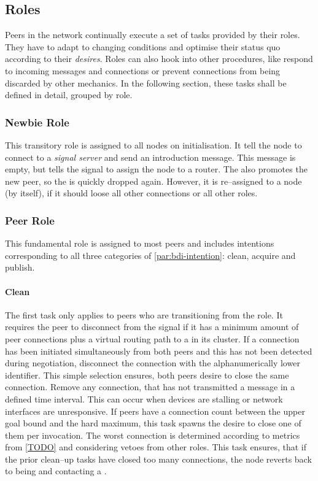 \subsection{Roles}
Peers in the network continually execute a set of tasks provided by their roles. They have to adapt to changing conditions and optimise their status quo according to their \textit{desires}. Roles can also hook into other procedures, like respond to incoming messages and connections or prevent connections from being discarded by other mechanics. In the following section, these tasks shall be defined in detail, grouped by role.

\subsubsection{Newbie Role}
This transitory role is assigned to all nodes on initialisation. It tell the node to connect to a \textit{signal server} and send an introduction message. This message is empty, but tells the signal to assign the node to a router. The \signalRole also promotes the new peer, so the \newbieRole is quickly dropped again. However, it is re–assigned to a node (by itself), if it should loose all other connections or all other roles.

\subsubsection{Peer Role}
This fundamental role is assigned to most peers and includes intentions corresponding to all three categories of \vref{par:bdi-intention}: clean, acquire and publish.

\paragraph{Clean}
\begin{itemize}
     The first task only applies to peers who are transitioning from the \newbieRole role. It requires the peer to disconnect from the signal if it has a minimum amount of peer connections plus a virtual routing path to a \routerRole in its cluster.
     If a connection has been initiated simultaneously from both peers and this has not been detected during negotiation, disconnect the connection with the alphanumerically lower identifier. This simple selection ensures, both peers desire to close the same connection.
     Remove any connection, that has not transmitted a message in a defined time interval. This can occur when devices are stalling or network interfaces are unresponsive.
     If peers have a connection count between the upper goal bound and the hard maximum, this task spawns the desire to close one of them per invocation. The worst connection is determined according to metrics from \ref{TODO} and considering vetoes from other roles.
     This task ensures, that if the prior clean–up tasks have closed too many connections, the node reverts back to being \newbieRole and contacting a \signalRole.
\end{itemize}

